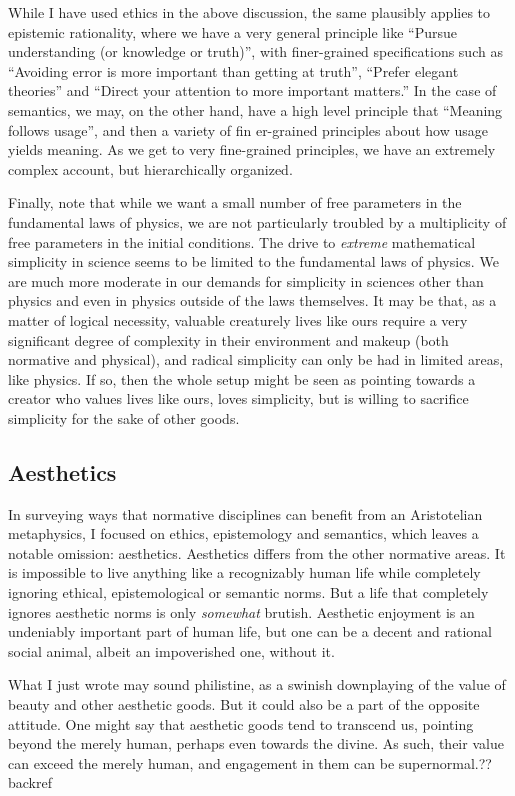 While I have used ethics in the above discussion, the same plausibly applies to epistemic rationality, where we have a very general
principle like ``Pursue understanding (or knowledge or truth)'', with finer-grained specifications such as ``Avoiding error is more
important than getting at truth'', ``Prefer elegant theories'' and ``Direct your attention to more important matters.'' In the case
of semantics, we may, on the other hand, have a high level principle that ``Meaning follows usage'', and then a variety of fin er-grained 
principles about how usage yields meaning. As we get to very fine-grained principles, we have an extremely complex account, but hierarchically
organized.

Finally, note that while we want a small number of free parameters in the fundamental laws of physics, we are not
particularly troubled by a multiplicity of free parameters in the initial conditions. The drive to \textit{extreme}
mathematical simplicity in science seems to be limited to the fundamental laws of physics. We are much more
moderate in our demands for simplicity in sciences other than physics and even in physics outside of the laws
themselves. It may be that, as a matter of logical necessity, valuable creaturely lives like ours require a
very significant degree of complexity in their environment and makeup (both normative and physical), and radical
simplicity can only be had in limited areas, like physics. If so, then the whole setup might be seen as pointing 
towards a creator who values lives like ours, loves simplicity, but is willing to sacrifice simplicity for the
sake of other goods.

\subsection{Aesthetics}
In surveying ways that normative disciplines can benefit from an Aristotelian metaphysics, I focused on 
ethics, epistemology and semantics, which leaves a notable omission: aesthetics. Aesthetics differs from
the other normative areas. It is impossible to live anything like a recognizably human 
life while completely ignoring ethical, epistemological or semantic norms. But a life that completely ignores 
aesthetic norms is only \textit{somewhat} brutish. Aesthetic enjoyment is an undeniably important part of 
human life, but one can be a decent and rational social animal, albeit an impoverished one, without it. 

What I just wrote may sound philistine, as a swinish downplaying of the value of beauty and other aesthetic
goods. But it could also be a part of the opposite attitude. One might say that aesthetic goods tend to 
transcend us, pointing beyond the merely human, perhaps even towards the divine. As such, their value can
exceed the merely human, and engagement in them can be supernormal.??backref

